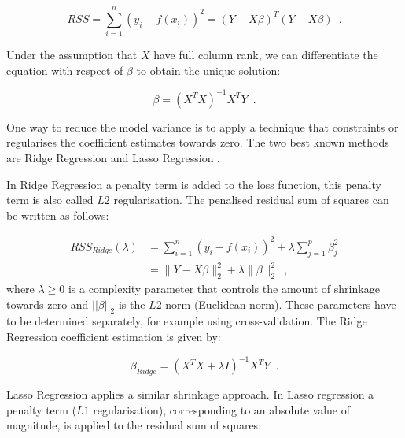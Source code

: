 \begin{equation}
    RSS = \sum_{i=1}^{n}(y_i -f(x_i))^2 = (Y - X\beta)^T(Y - X\beta)
    \enspace.
\end{equation}

Under the assumption that $X$ have full column rank, we can differentiate the equation with respect of $\beta$ to obtain the unique solution:

\begin{equation}
    \beta = (X^TX)^{-1}X^TY
    \enspace.
\end{equation}

One way to reduce the model variance is to apply a technique that constraints or regularises the coefficient estimates towards zero. The two best known methods are Ridge Regression \citep{hoerl1970ridge} and Lasso Regression \citep{tibshirani1996regression}. 

In Ridge Regression a penalty term is added to the loss function, this penalty term is also called $L2$ regularisation. The penalised residual sum of squares can be written as follows:

\begin{equation}
\begin{aligned}
 RSS_{Ridge}(\lambda) & = \sum_{i=1}^{n}(y_i -f(x_i))^2 + \lambda\sum_{j=1}^{p}\beta^{2}_{j} \\
& = \|Y - X\beta\|_2^2 + \lambda\|\beta\|_2^2
    \enspace,
\end{aligned}
\end{equation}
where $ \lambda \geq 0 $ is a complexity parameter that controls the amount of shrinkage towards zero and $||\beta||_2$ is the $L2$-norm (Euclidean norm). These parameters have to be determined separately, for example using cross-validation. The Ridge Regression coefficient estimation is given by:

\begin{equation}
    \beta_{Ridge} = (X^TX + \lambda I)^{-1}X^TY
    \enspace.
\end{equation}

Lasso Regression applies a similar shrinkage approach. In Lasso regression a penalty term ($L1$ regularisation), corresponding to an absolute value of magnitude, is applied to the residual sum of squares:

